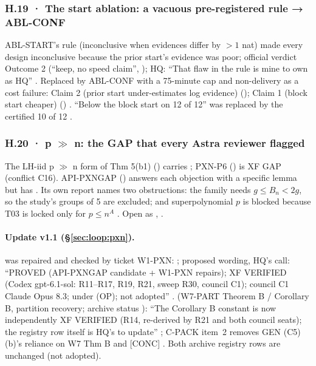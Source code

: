 \subsubsection*{H.19 · The start ablation: a vacuous pre-registered rule → ABL-CONF}
ABL-START's rule (inconclusive when evidences differ by $>1$ nat) made every design inconclusive because the prior start's evidence was poor; official verdict Outcome 2 (``keep, no speed claim'', ); HQ: ``That flaw in the rule is mine to own as HQ''  . Replaced by ABL-CONF with a 75-minute cap and non-delivery as a cost failure: Claim 2 (prior start under-estimates log evidence)  (); Claim 1 (block start cheaper)  () . ``Below the block start on 12 of 12'' was replaced by the certified 10 of 12 .

\subsubsection*{H.20 · p $\gg$ n: the GAP that every Astra reviewer flagged}
The LH-iid p $\gg$ n form of Thm 5(b1) () carries  ; PXN-P6 () is XF GAP (conflict C16). API-PXNGAP () answers each objection with a specific lemma but has  . Its own report names two obstructions: the family needs $g\le B_n<2g$, so the study's groups of 5 are excluded; and superpolynomial $p$ is blocked because T03 is locked only for $p\le n^A$ . Open as , .

\paragraph{Update v1.1 (\S\ref{sec:loop:pxn}).}  was repaired and checked by ticket W1-PXN: ; proposed wording, HQ's call: ``PROVED (API-PXNGAP candidate + W1-PXN repairs); XF VERIFIED (Codex gpt-6.1-sol: R11–R17, R19, R21, sweep R30, council C1); council C1 Claude Opus 8.3; under (OP); not adopted'' .  (W7-PART Theorem B / Corollary B, partition recovery; archive status  ): ``The Corollary B constant is now independently XF VERIFIED (R14, re-derived by R21 and both council seats); the registry row itself is HQ's to update'' ; C-PACK item~2 removes GEN (C5)(b)'s reliance on W7 Thm B and [CONC] . Both archive registry rows are unchanged (not adopted).

